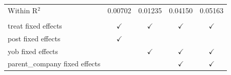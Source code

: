 \begin{table}[htbp]
\begin{tabular}{lcccc}
      Within R$^2$                   & 0.00702       & 0.01235       & 0.04150       & 0.05163\\  
       \\
      treat fixed effects            & $\checkmark$  & $\checkmark$  & $\checkmark$  & $\checkmark$\\   
      post fixed effects             & $\checkmark$  &               &               & \\  
      yob fixed effects              &               & $\checkmark$  & $\checkmark$  & $\checkmark$\\   
      parent\_company fixed effects  &               &               & $\checkmark$  & $\checkmark$\\   
      \bottomrule
   \end{tabular}
\end{table}


